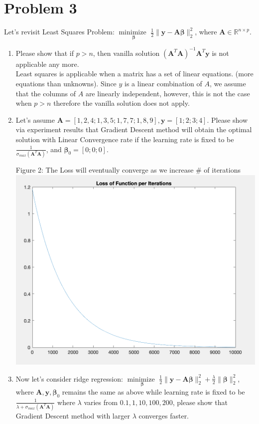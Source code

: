 \documentclass[11pt]{article}
\newcommand{\R}{\mathbb{R}}
\newcommand{\minimize}{\operatorname*{minimize\ }}
\newcommand{\mtx}[1]{\mathbf{#1}}
\newcommand{\vct}[1]{\mathbf{#1}}
\def \mA {\mtx{A}}
\def \vy {\vct{y}}
\def \R {\mathbb{R}}
\begin{document}
	\section*{Problem 3}
	Let's revisit Least Squares Problem: $\minimize \limits_{\bm{\beta}} \frac{1}{2}\|\vy-\mA\bm{\beta}\|^2_2$, where $\mA\in\R^{n\times p}$.
	\begin{enumerate}
		\item Please show that if $p>n$, then vanilla solution $(\mA^T\mA)^{-1}\mA^T\vy$ is not applicable any more.	\\
		Least squares is applicable when  a matrix has a set of linear equations. (more equations than unknowns). Since $y$ is a linear combination of $A$, we assume that the columns of $A$ are linearly independent, however, this is not the case when $p > n$ therefore the vanilla solution does not apply. 
		\item Let's assume $\mA=[1, 2, 4;1, 3, 5; 1, 7, 7; 1, 8, 9], \vy=[1;2;3;4]$. Please show via experiment results that Gradient Descent method will obtain the optimal solution with  Linear Convergence rate if the learning rate is fixed to be $\frac{1}{\sigma_{max}(\mA^T\mA)}$, and $\bm{\beta}_0=[0;0;0]$.	
		
Figure 2: The Loss will eventually converge as we increase \# of iterations\\
\includegraphics[scale=.6]{Loss_least_squares}

 
		\item Now let's consider ridge regression: $\minimize \limits_{\bm{\beta}} \frac{1}{2}\|\vy-\mA\bm{\beta}\|^2_2+\frac{\lambda}{2} \|\bm{\beta}\|^2_2$, where  $\mA,\vy,\bm{\beta}_0$ remains the same as above while learning rate is fixed to be $\frac{1}{\lambda+\sigma_{max}(\mA^T\mA)}$ where $\lambda$ varies from $0.1,1,10,100,200$, please show that Gradient Descent method with larger $\lambda$ converges faster. \\


\end{enumerate}
\end{document}
